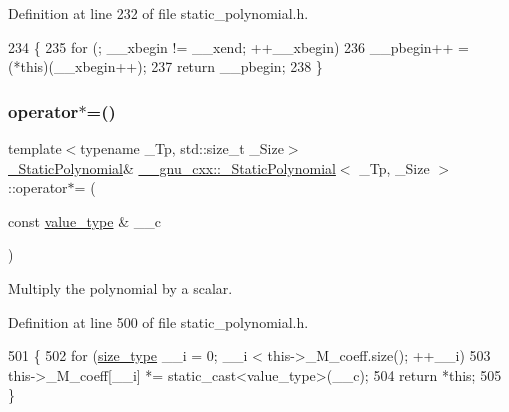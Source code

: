 Definition at line 232 of file static\+\_\+polynomial.\+h.


\begin{DoxyCode}
234         \{
235           \textcolor{keywordflow}{for} (; \_\_xbegin != \_\_xend; ++\_\_xbegin)
236             \_\_pbegin++ = (*\textcolor{keyword}{this})(\_\_xbegin++);
237           \textcolor{keywordflow}{return} \_\_pbegin;
238         \}
\end{DoxyCode}
\mbox{\label{class____gnu__cxx_1_1__StaticPolynomial_ace79869d7827c6aa59519f5f3860f41a}} 
\subsubsection{\texorpdfstring{operator$\ast$=()}{operator*=()}}
{\footnotesize\ttfamily template$<$typename \+\_\+\+Tp, std\+::size\+\_\+t \+\_\+\+Size$>$ \\
\hyperlink{class____gnu__cxx_1_1__StaticPolynomial}{\+\_\+\+Static\+Polynomial}\& \hyperlink{class____gnu__cxx_1_1__StaticPolynomial}{\+\_\+\+\_\+gnu\+\_\+cxx\+::\+\_\+\+Static\+Polynomial}$<$ \+\_\+\+Tp, \+\_\+\+Size $>$\+::operator$\ast$= (\begin{DoxyParamCaption}\item[{const \hyperlink{class____gnu__cxx_1_1__StaticPolynomial_aad5f3d6d5876b6926b30724aeac649d6}{value\+\_\+type} \&}]{\+\_\+\+\_\+c }\end{DoxyParamCaption})\hspace{0.3cm}{\ttfamily [inline]}}

Multiply the polynomial by a scalar. 

Definition at line 500 of file static\+\_\+polynomial.\+h.


\begin{DoxyCode}
501       \{
502         \textcolor{keywordflow}{for} (\hyperlink{class____gnu__cxx_1_1__StaticPolynomial_a0cc0aa4adab35686ef2474e07f511ff9}{size\_type} \_\_i = 0; \_\_i < this->\_M\_coeff.size(); ++\_\_i)
503           this->\_M\_coeff[\_\_i] *= static\_cast<value\_type>(\_\_c);
504         \textcolor{keywordflow}{return} *\textcolor{keyword}{this};
505       \}
\end{DoxyCode}
\mbox{\label{class____gnu__cxx_1_1__StaticPolynomial_a12e71deb96cf5d1d41bbad7339ca77aa}} 

